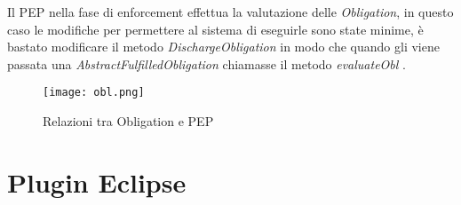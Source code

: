 Il \ac{PEP} nella fase di enforcement effettua la valutazione delle \textit{Obligation}, in questo caso le modifiche per permettere al sistema di eseguirle sono state minime, è bastato modificare il metodo \textit{DischargeObligation} in modo che quando gli viene passata una \textit{AbstractFulfilledObligation} chiamasse il metodo \textit{evaluateObl} .
\begin{sidewaysfigure}[H]
    \centering
	\texttt{[image: obl.png]}
    \caption{Relazioni tra Obligation e PEP}
    \label{fig:obl.png}
\end{sidewaysfigure}




\section{Plugin Eclipse}
\label{sec:plugin_eclipse}

